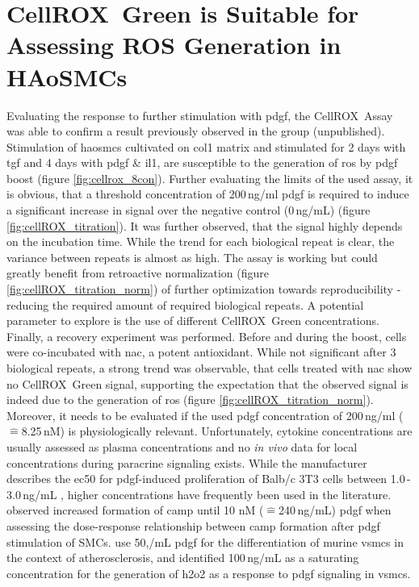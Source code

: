 \section{CellROX\texttrademark~Green is Suitable for Assessing ROS Generation in HAoSMCs}
Evaluating the response to further stimulation with \ac{pdgf}, the CellROX\texttrademark~Assay was able to confirm a result previously observed in the group (unpublished). Stimulation of \acp{haosmc} cultivated on \ac{col1} matrix and stimulated for 2 days with \ac{tgf} and 4 days with \ac{pdgf} \& \ac{il1}, are susceptible to the generation of \ac{ros} by \ac{pdgf} boost (figure \ref{fig:cellrox_8con}). Further evaluating the limits of the used assay, it is obvious, that a threshold concentration of 200\,ng/ml \ac{pdgf} is required to induce a significant increase in signal over the negative control (0\,ng/mL) (figure \ref{fig:cellROX_titration}). It was further observed, that the signal highly depends on the incubation time. While the trend for each biological repeat is clear, the variance between repeats is almost as high. The assay is working but could greatly benefit from retroactive normalization (figure \ref{fig:cellROX_titration_norm}) of further optimization towards reproducibility - reducing the required amount of required biological repeats. A potential parameter to explore is the use of different CellROX\texttrademark~Green concentrations. Finally, a recovery experiment was performed. Before and during the boost, cells were co-incubated with \ac{nac}, a potent antioxidant. While not significant after 3 biological repeats, a strong trend was observable, that cells treated with \ac{nac} show no CellROX\texttrademark~Green signal, supporting the expectation that the observed signal is indeed due to the generation of \ac{ros} (figure \ref{fig:cellROX_titration_norm}).\\
Moreover, it needs to be evaluated if the used \ac{pdgf} concentration of 200\,ng/ml ($\widehat{=}$8.25\,nM) is physiologically relevant. Unfortunately, cytokine concentrations are usually assessed as plasma concentrations and no \textit{in vivo} data for local concentrations during paracrine signaling exists. While the manufacturer describes the \ac{ec50} for \ac{pdgf}-induced proliferation of Balb/c 3T3 cells between 1.0\,-\,3.0\,ng/mL \cite{peprotecheclimitedRecombinantHumanPDGFBB2022}, higher concentrations have frequently been used in the literature. \textcite{gravesPlateletderivedGrowthFactor1996a} observed increased formation of \ac{camp} until 10 nM ($\widehat{=}$240\,ng/mL) \ac{pdgf} when assessing the dose-response relationship between \ac{camp} formation after \ac{pdgf} stimulation of SMCs. \textcite{newmanMultipleCellTypes2021a} use 50,\ng/mL \ac{pdgf} for the differentiation of murine \acp{vsmc} in the context of atherosclerosis, and \textcite{bouziguesRegulationROSResponse2014a} identified 100\,ng/mL as a saturating concentration for the generation of \ac{h2o2} as a response to \ac{pdgf} signaling in \acp{vsmc}.\\
